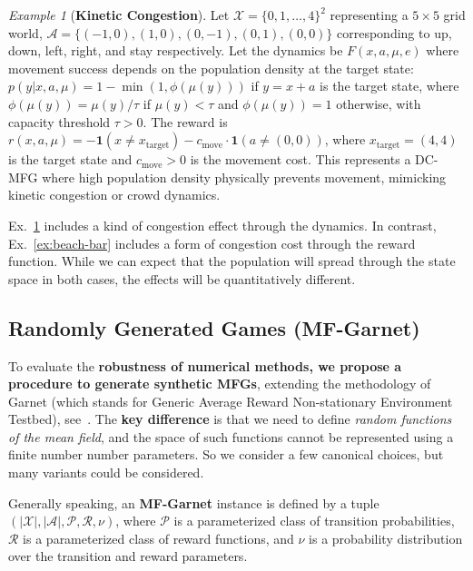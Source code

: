 \documentclass[10pt,twocolumn,letterpaper]{article}
\theoremstyle{definition}
\theoremstyle{remark}
\newtheorem{example}{Example}
\newcommand{\states}{\mathcal{X}}
\newcommand{\actions}{\mathcal{A}}
\newcommand{\cP}{\mathcal{P}}
\newcommand{\cR}{\mathcal{R}}
\begin{document}
\begin{example}[\textbf{Kinetic Congestion}]
    \label{ex:dc2}
    Let $\states = \{0, 1, \ldots, 4\}^2$ representing a $5 \times 5$ grid world, $\actions = \{(-1,0), (1,0), (0,-1), (0,1), (0,0)\}$ corresponding to up, down, left, right, and stay respectively. Let the dynamics be $F(x, a, \mu, e)$ where movement success depends on the population density at the target state: $p(y|x, a, \mu) = 1 - \min(1, \phi(\mu(y)))$ if $y = x + a$ is the target state, where $\phi(\mu(y)) = \mu(y) / \tau$ if $\mu(y) < \tau$ and $\phi(\mu(y)) = 1$ otherwise, with capacity threshold $\tau > 0$. The reward is $r(x, a, \mu) = -\mathbf{1}(x \neq x_{\text{target}}) - c_{\text{move}} \cdot \mathbf{1}(a \neq (0,0))$, where $x_{\text{target}} = (4,4)$ is the target state and $c_{\text{move}} > 0$ is the movement cost. This represents a DC-MFG where high population density physically prevents movement, mimicking kinetic congestion or crowd dynamics.
\end{example}
 Ex.~\ref{ex:dc2} includes a kind of congestion effect through the dynamics. In contrast,  Ex.~\ref{ex:beach-bar} includes a form of congestion cost through the reward function. While we can expect that the population will spread through the state space in both cases, the effects will be quantitatively different.
\subsection{Randomly Generated Games (MF-Garnet)}

To evaluate the \textbf{robustness of numerical methods, we propose a procedure to generate synthetic MFGs}, extending the methodology of Garnet (which stands for Generic Average Reward Non-stationary Environment Testbed), see~\citep{archibald1995generation,bhatnagar2009natural}. The \textbf{key difference} is that we need to define \emph{random functions of the mean field}, and the space of such functions cannot be represented using a finite number number parameters. So we consider a few canonical choices, but many variants could be considered. 
\begin{mdframed}[
    linewidth=0pt,        %
    roundcorner=5pt,        %
    backgroundcolor=blue!5, 
    innertopmargin=3pt, 
    innerbottommargin=2pt
]
Generally speaking,
an \textbf{MF-Garnet} instance is defined by a tuple $(|\states|, |\actions|, \cP, \cR, \nu)$, where $\cP$ is a parameterized class of transition probabilities, $\cR$ is a parameterized class of reward functions, and $\nu$ is a probability distribution over the transition and reward parameters.
\end{mdframed}
\end{document}
